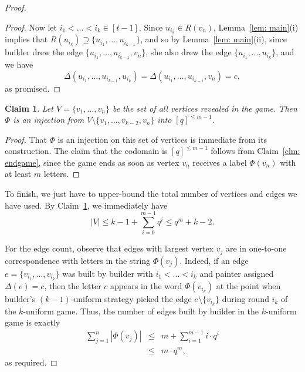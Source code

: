\documentclass[10pt,a4paper]{amsart}
\newtheorem{claim}{Claim}
\begin{document}
\begin{proof}
\begin{proof}
    Now let $i_1 < \dots < i_k \in [t-1]$.
    Since $u_{i_k} \in R(v_n)$, Lemma~\ref{lem: main}(i) implies that
    $R(u_{i_k}) \supseteq \{u_{i_1}, \dots, u_{i_{k-1}}\}$, and so by Lemma~\ref{lem: main}(ii), since builder drew the edge $\{u_{i_1}, \dots, u_{i_{k-1}}, v_n\}$, she also drew the edge $\{u_{i_1}, \dots, u_{i_k}\}$, and we have
    \begin{equation*}
        \Delta(u_{i_1}, \dots, u_{i_{k-1}}, u_{i_k}) = \Delta(u_{i_1}, \dots, u_{i_{k-1}}, v_n) = c,
    \end{equation*}
    as promised.
\end{proof}

\begin{claim}
\label{clm: injection}
    Let $V = \{v_1, \dots, v_n\}$ be the set of all vertices revealed in the game.
    Then $\Phi$ is an injection from $V \setminus \{v_1, \dots, v_{k-2}, v_n\}$ into $[q]^{\leq m-1}$.
\end{claim}

\begin{proof}
    That $\Phi$ is an injection on this set of vertices is immediate from its construction.
    The claim that the codomain is $[q]^{\leq m-1}$ follows from Claim~\ref{clm: endgame}, since the game ends as soon as vertex $v_n$ receives a label $\Phi(v_n)$ with at least $m$ letters.
\end{proof}

To finish, we just have to upper-bound the total number of vertices and edges we have used.
By Claim~\ref{clm: injection}, we immediately have
\begin{equation*}
    |V| \leq k-1+\sum_{i=0}^{m-1} q^i \leq q^m + k - 2.
\end{equation*}

For the edge count, observe that edges with largest vertex $v_j$ are in one-to-one correspondence with letters in the string $\Phi(v_j)$.
Indeed, if an edge $e = \{v_{i_1}, \dots, v_{i_k}\}$ was built by builder with $i_1 < \dots < i_k$ and painter assigned $\Delta(e) = c$, then the letter $c$ appears in the word $\Phi(v_{i_k})$ at the point when builder's $(k-1)$-uniform strategy picked the edge $e \setminus \{v_{i_k}\}$ during round $i_k$ of the $k$-uniform game.
Thus, the number of edges built by builder in the $k$-uniform game is exactly
\begin{eqnarray*}
    \sum_{j=1}^n |\Phi(v_j)|
    &\leq& m + \sum_{i=1}^{m-1} i \cdot q^i\\
    &\leq& m \cdot q^m,
\end{eqnarray*}
as required.
\end{proof}
\end{document}
